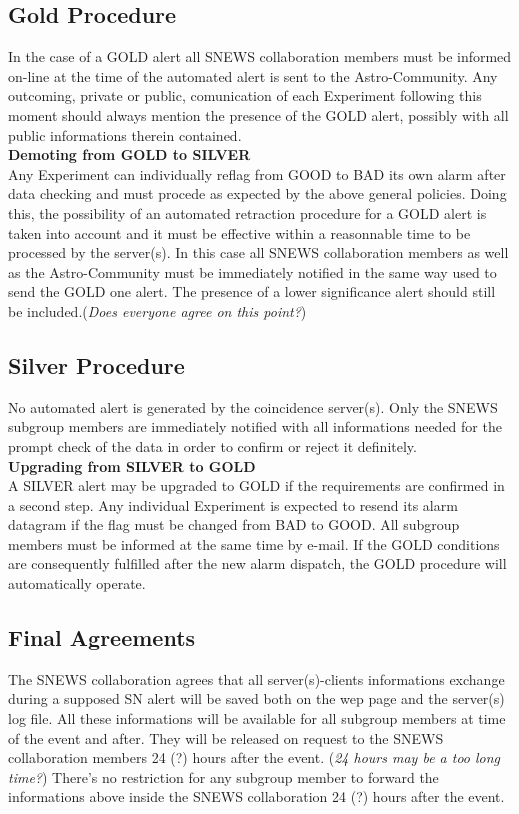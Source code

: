 \documentclass{article}
\begin{document}
\subsection{Gold Procedure}
In the case of a GOLD alert all SNEWS collaboration members must be informed
on-line at the time of the automated alert is sent to the Astro-Community. 
Any outcoming, private or public, comunication of each Experiment following 
this moment should always 
mention the presence of the GOLD alert, possibly with all public informations
therein contained.\\
{\bf Demoting from GOLD to SILVER}\\
Any Experiment can individually reflag from GOOD to BAD its own alarm after
data checking and must procede as expected by the above general policies.
Doing this, the possibility of an automated retraction procedure for a GOLD 
alert is taken into account and it must be effective within a reasonnable
time to be processed by the server(s). 
In this case all SNEWS collaboration members as well as 
the Astro-Community must be immediately notified in the same way used to
send the GOLD one alert. The presence of a lower significance alert should 
still be included.({\it Does everyone agree on this point?})

\subsection{Silver Procedure}
No automated alert is generated by the coincidence server(s). 
Only the  SNEWS subgroup members are immediately notified 
with all informations needed for the prompt check of the data in order to 
confirm or reject it definitely.\\
\textbf{Upgrading from SILVER to GOLD}\\
A SILVER alert may be upgraded to GOLD if the requirements are confirmed in a second step. Any
individual Experiment is expected to resend its alarm datagram if the flag must be  changed from 
BAD to GOOD. All subgroup members must be informed at the same time
by e-mail. If the GOLD conditions are consequently fulfilled after the new alarm dispatch,  
the GOLD procedure will automatically operate.

\subsection{Final Agreements}

The SNEWS collaboration agrees that all server(s)-clients informations exchange 
during a supposed SN alert will be saved both on the wep page and the server(s) 
log file. All these informations will be available for all subgroup members
at time of the event and after. 
They will be released on request to the SNEWS collaboration members 24 (?) hours after the event.
({\it 24 hours may be a too long time?})
There's no restriction for any subgroup member to forward the informations
above inside the SNEWS collaboration  24 (?) hours after the event.
\end{document}
